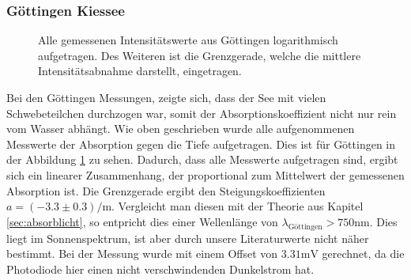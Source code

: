 \documentclass[12pt,a4paper,titlepage,headinclude,bibtotoc]{scrartcl}
\numberwithin{equation}{subsection}
\begin{document}
\subsubsection{Göttingen Kiessee}
\begin{figure}[!htb]
	\centering
	
	\caption{Alle gemessenen Intensitätswerte aus Göttingen logarithmisch aufgetragen. Des Weiteren ist die Grenzgerade, welche die mittlere Intensitätsabnahme darstellt, eingetragen.}
	\label{fig:lichtGoe}
\end{figure}
Bei den Göttingen Messungen, zeigte sich, dass der See mit vielen Schwebeteilchen durchzogen war, somit der Absorptionskoeffizient nicht nur rein vom Wasser abhängt.
Wie oben geschrieben wurde alle aufgenommenen Messwerte der Absorption gegen die Tiefe aufgetragen.
Dies ist für Göttingen in der Abbildung \ref{fig:lichtGoe} zu sehen.
Dadurch, dass alle Messwerte aufgetragen sind, ergibt sich ein linearer Zusammenhang, der proportional zum Mittelwert der gemessenen Absorption ist.
Die Grenzgerade ergibt den Steigungskoeffizienten $a=(-3.3\pm0.3)\si{\per\meter}$.
Vergleicht man diesen mit der Theorie aus Kapitel \ref{sec:absorblicht}, so entpricht dies einer Wellenlänge von $\lambda_\text{Göttingen}>750\si{\nano\meter}$.
Dies liegt im Sonnenspektrum, ist aber durch unsere Literaturwerte nicht näher bestimmt.
Bei der Messung wurde mit einem Offset von $3.31\si{\milli\volt}$ gerechnet, da die Photodiode hier einen nicht verschwindenden Dunkelstrom hat.
\end{document}
